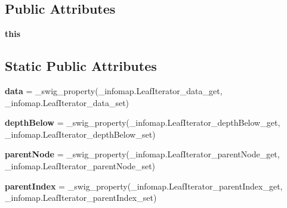\subsection*{Public Attributes}
\begin{DoxyCompactItemize}
\item 
\mbox{\label{classinfomapfolder_1_1infomap_1_1LeafIterator_ad03a540a6b4dfe0d650973098a984939}} 
{\bfseries this}
\end{DoxyCompactItemize}
\subsection*{Static Public Attributes}
\begin{DoxyCompactItemize}
\item 
\mbox{\label{classinfomapfolder_1_1infomap_1_1LeafIterator_a4dbdc572780f980827cf9f73c8722831}} 
{\bfseries data} = \+\_\+swig\+\_\+property(\+\_\+infomap.\+Leaf\+Iterator\+\_\+data\+\_\+get, \+\_\+infomap.\+Leaf\+Iterator\+\_\+data\+\_\+set)
\item 
\mbox{\label{classinfomapfolder_1_1infomap_1_1LeafIterator_a9e32947071edfb04a5650791b44d7277}} 
{\bfseries depth\+Below} = \+\_\+swig\+\_\+property(\+\_\+infomap.\+Leaf\+Iterator\+\_\+depth\+Below\+\_\+get, \+\_\+infomap.\+Leaf\+Iterator\+\_\+depth\+Below\+\_\+set)
\item 
\mbox{\label{classinfomapfolder_1_1infomap_1_1LeafIterator_a5f601ea3fe62363bf3a4dccd7398114d}} 
{\bfseries parent\+Node} = \+\_\+swig\+\_\+property(\+\_\+infomap.\+Leaf\+Iterator\+\_\+parent\+Node\+\_\+get, \+\_\+infomap.\+Leaf\+Iterator\+\_\+parent\+Node\+\_\+set)
\item 
\mbox{\label{classinfomapfolder_1_1infomap_1_1LeafIterator_a82fa2ae52e39a6558bbfc3ebd7cf1f26}} 
{\bfseries parent\+Index} = \+\_\+swig\+\_\+property(\+\_\+infomap.\+Leaf\+Iterator\+\_\+parent\+Index\+\_\+get, \+\_\+infomap.\+Leaf\+Iterator\+\_\+parent\+Index\+\_\+set)
\item 
\mbox{\label{classinfomapfolder_1_1infomap_1_1LeafIterator_a0679c1f4e7ba021b69265400356f0e93}} 

\end{DoxyCompactItemize}

